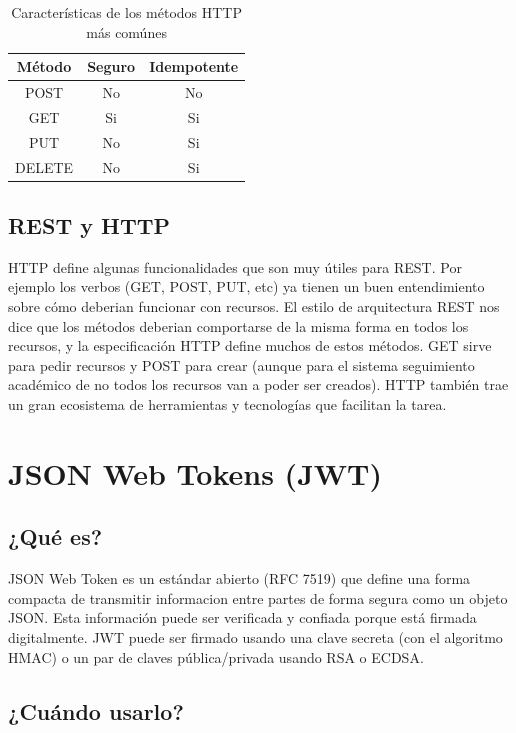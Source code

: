 \begin{table}[]
    \centering
    \makegapedcells
    \begin{tabular}{|c|c|c|}
    \hline
    Método & Seguro & Idempotente \\ \hline
    POST & No & No \\ \hline
    GET & Si & Si \\ \hline
    PUT & No & Si \\ \hline
    DELETE & No & Si \\ \hline
    
    \end{tabular}
    \caption{Características de los métodos HTTP más comúnes}
    \label{tab:tabla_planes}
\end{table}

\subsection[REST y HTTP]{REST y HTTP}
HTTP define algunas funcionalidades que son muy útiles para REST. Por ejemplo los verbos (GET, POST, PUT, etc) ya tienen un buen entendimiento sobre cómo deberian funcionar con recursos. El estilo de arquitectura REST nos dice que los métodos deberian comportarse de la misma forma en todos los recursos, y la especificación HTTP define muchos de estos métodos. 
GET sirve para pedir recursos y POST para crear (aunque para el sistema seguimiento académico de no todos los recursos van a poder ser creados).
HTTP también trae un gran ecosistema de herramientas y tecnologías que facilitan la tarea. 


\section[JSON Web Tokens (JWT)]{JSON Web Tokens (JWT)}
\subsection[¿Qué es?]{¿Qué es?}

JSON Web Token es un estándar abierto (RFC 7519) que define una forma compacta de transmitir informacion entre partes de forma segura como un objeto JSON. Esta información puede ser verificada y confiada porque está firmada digitalmente. JWT puede ser firmado usando una clave secreta (con el algoritmo HMAC) o un par de claves pública/privada usando RSA o ECDSA.


\subsection[¿Cuándo usarlo?]{¿Cuándo usarlo?}

